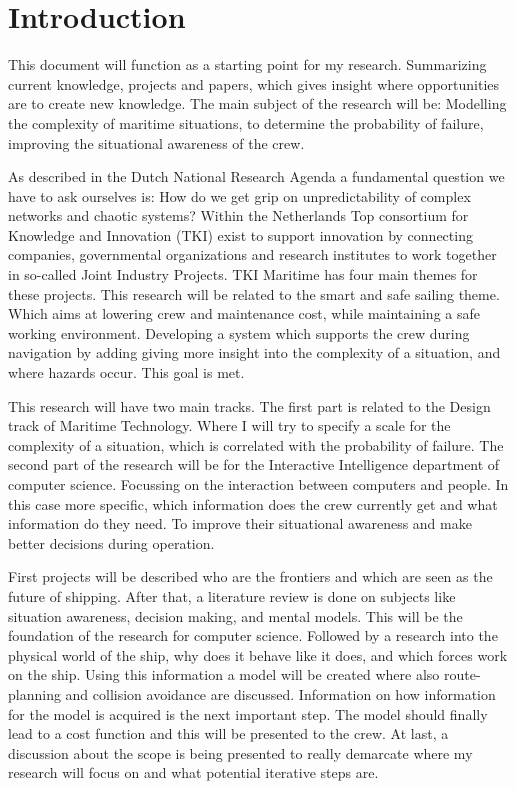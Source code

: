 \section*{Introduction}
\label{sec:introduction}
This document will function as a starting point for my research. Summarizing current knowledge, projects and papers, which gives insight where opportunities are to create new knowledge. The main subject of the research will be: Modelling the complexity of maritime situations, to determine the probability of failure, improving the situational awareness of the crew.

As described in the Dutch National Research Agenda a fundamental question we have to ask ourselves is: How do we get grip on unpredictability of complex networks and chaotic systems? Within the Netherlands Top consortium for Knowledge and Innovation (TKI) exist to support innovation by connecting companies, governmental organizations and research institutes to work together in so-called Joint Industry Projects. TKI Maritime has four main themes for these projects. This research will be related to the smart and safe sailing theme. Which aims at lowering crew and maintenance cost, while maintaining a safe working environment. Developing a system which supports the crew during navigation by adding giving more insight into the complexity of a situation, and where hazards occur. This goal is met.

This research will have two main tracks. The first part is related to the Design track of Maritime Technology. Where I will try to specify a scale for the complexity of a situation, which is correlated with the probability of failure. The second part of the research will be for the Interactive Intelligence department of computer science. Focussing on the interaction between computers and people. In this case more specific, which information does the crew currently get and what information do they need. To improve their situational awareness and make better decisions during operation.

First projects will be described who are the frontiers and which are seen as the future of shipping.
After that, a literature review is done on subjects like situation awareness, decision making, and mental models. This will be the foundation of the research for computer science. 
Followed by a research into the physical world of the ship, why does it behave like it does, and which forces work on the ship. Using this information a model will be created where also route-planning and collision avoidance are discussed. 
Information on how information for the model is acquired is the next important step. The model should finally lead to a cost function and this will be presented to the crew. 
At last, a discussion about the scope is being presented to really demarcate where my research will focus on and what potential iterative steps are. 

